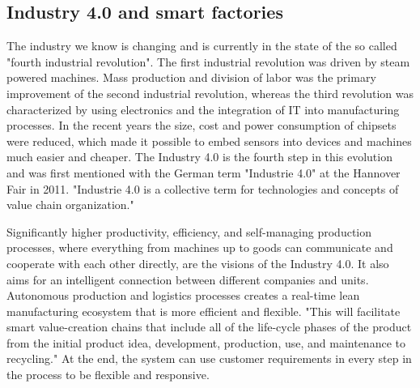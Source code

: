 \subsection{Industry 4.0 and smart factories}
The industry we know is changing and is currently in the state of the so called "fourth industrial revolution".
The first industrial revolution was driven by steam powered machines.
Mass production and division of labor was the primary improvement of the second industrial revolution, whereas the third revolution was characterized by using electronics and the integration of \ac{IT} into manufacturing processes.\autocite[cf.][p. 1]{Lom:2016}
In the recent years the size, cost and power consumption of chipsets were reduced, which made it possible to embed sensors into devices and machines much easier and cheaper.\autocite[cf.][p. 1]{Brito:2016}
The Industry 4.0 is the fourth step in this evolution and was first mentioned with the German term "Industrie 4.0" at the Hannover Fair in 2011.\autocite[cf.][p. 1]{Lom:2016}
"Industrie 4.0 is a collective term for technologies and concepts of value chain organization."\autocite[cf.][p. 11]{Her:2015}

Significantly higher productivity, efficiency, and self-managing production processes, where everything from machines up to goods can communicate and cooperate with each other directly, are the visions of the Industry 4.0.\autocite[cf.]{Lyd:2016}
It also aims for an intelligent connection between different companies and units.
Autonomous production and logistics processes creates a real-time lean manufacturing ecosystem that is more efficient and flexible.\autocite[cf.]{Lyd:2016}
"This will facilitate smart value-creation chains that include all of the life-cycle phases of the product from the initial product idea, development, production, use, and maintenance to recycling."\autocite{Lyd:2016}
At the end, the system can use customer requirements in every step in the process to be flexible and responsive.\autocite[cf.]{Lyd:2016}

